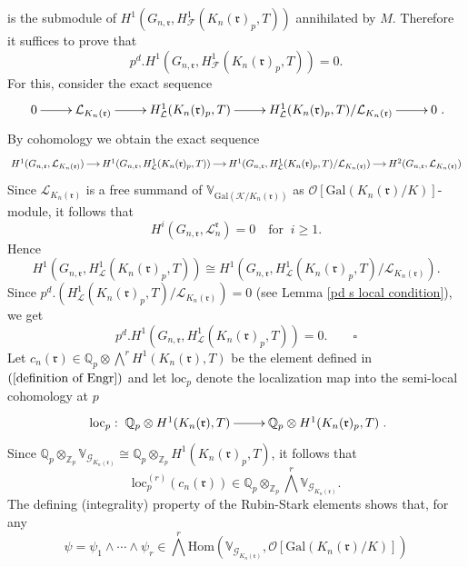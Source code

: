 \documentclass[reqno]{amsart}
\begin{document}
is the submodule of
$H^{1}(G_{n,\mathfrak{r}},H^{1}_{\mathcal{F}}(K_{n}(\mathfrak{r})_{p},T))$
annihilated by $M$. Therefore  it suffices to prove that
$$
p^{d}.H^{1}(G_{n,\mathfrak{r}},H^
{1}_{\mathcal{F}}(K_{n}(\mathfrak{r})_{p},T))=0.
$$
For this, consider the exact sequence
$$
\xymatrix@=2pc{0\ar[r]& \mathcal{L}_{K_{n}(\mathfrak{r})}\ar[r]&
H^{1}_{\mathcal{L}}(K_{n}(\mathfrak{r})_{p},T)\ar[r]&
H^{1}_{\mathcal{L}}(K_{n}(\mathfrak{r})_{p},T)/\mathcal{L}_{K_{n}(\mathfrak{r})}\ar[r]&0}.
$$
 By cohomology we obtain the exact sequence
$$
\xymatrix@=1pc{H^{1}(G_{n,\mathfrak{r}},\mathcal{L}_{K_{n}(\mathfrak{r})})\ar[r]&
H^{1}(G_{n,\mathfrak{r}},H^{1}_{\mathcal{L}}(K_{n}(\mathfrak{r})_{p},T))\ar[r]&
H^{1}(G_{n,\mathfrak{r}},H^{1}_{\mathcal{L}}(K_{n}(\mathfrak{r})_{p},T)/\mathcal{L}_{K_{n}(\mathfrak{r})})\ar[r]&
H^{2}(G_{n,\mathfrak{r}},\mathcal{L}_{K_{n}(\mathfrak{r})})}
$$
Since $\mathcal{L}_{K_{n}(\mathfrak{r})}$ is a free summand of
$\mathbb{V}_{\mathrm{Gal}(\mathcal{K}/K_{n}(\mathfrak{r}))}$ as
$\mathcal{O}[\mathrm{Gal}(K_{n}(\mathfrak{r})/K)]$-module, it
follows that
$$H^{i}(G_{n,\mathfrak{r}},\mathcal{L}_{n}^{\mathfrak{r}})=0\quad \mbox{
for}\;\; i\geq 1. $$
 Hence
$$
H^{1}(G_{n,\mathfrak{r}},H^{1}_{\mathcal{L}}(K_{n}(\mathfrak{r})_{p},T))\cong
H^{1}(G_{n,\mathfrak{r}},H^{1}_{\mathcal{L}}(K_{n}(\mathfrak{r})_{p},T)/\mathcal{L}_{K_{n}(\mathfrak{r})}).
$$
Since
$p^{d}.(H^{1}_{\mathcal{L}}(K_{n}(\mathfrak{r})_{p},T)/\mathcal{L}_{K_{n}(\mathfrak{r})})=0$
(see Lemma \ref{pd s local condition}), we get
$$
p^{d}.H^{1}(G_{n,\mathfrak{r}},H^{1}_{\mathcal{L}}(K_{n}(\mathfrak{r})_{p},T))=0.
\quad \quad \square
$$
Let $c_{n}(\mathfrak{r})\in
\mathbb{Q}_{p}\otimes\bigwedge^{r}H^{1}(K_{n}(\mathfrak{r}),T)$ be
the element defined in $(\ref{definition of Engr})$ and let $
\mathrm{loc}_{p}$ denote the localization map into the semi-local
cohomology at $p$
$$\xymatrix@=2pc{ \mathrm{loc}_{p}:\;
\mathbb{Q}_{p}\otimes
H^{1}(K_{n}(\mathfrak{r}),T)\ar[r]&\mathbb{Q}_{p}\otimes
H^{1}(K_{n}(\mathfrak{r})_{p},T)}.
$$
Since
$\mathbb{Q}_{p}\otimes_{\mathbb{Z}_{p}}\mathbb{V}_{\mathcal{G}_{K_{n}(\mathfrak{r})}}
\cong \mathbb{Q}_{p}\otimes_{\mathbb{Z}_{p}}
H^{1}(K_{n}(\mathfrak{r})_{p},T)$, it follows that
$$
\mathrm{loc}^{(r)}_{p}(c_{n}(\mathfrak{r}))\in
\mathbb{Q}_{p}\otimes_{\mathbb{Z}_{p}}\bigwedge^{r}\mathbb{V}_{\mathcal{G}_{K_{n}(\mathfrak{r})}}.
$$
The defining (integrality) property of the Rubin-Stark elements
shows that, for any
$$
\psi=\psi_{1}\wedge\cdots\wedge \psi_{r}\in
\bigwedge^{r}\mathrm{Hom}(\mathbb{V}_{\mathcal{G}_{K_{n}(\mathfrak{r})}},\mathcal{O}[\mathrm{Gal}(K_{n}(\mathfrak{r})/K)])
$$
\end{document}

